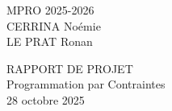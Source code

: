 \documentclass[class=article, crop=false]{standalone}
\begin{document}
\thispagestyle{plain}
\renewcommand{\footrulewidth}{0.4pt}
\renewcommand{\headrulewidth}{0.4pt}

\setlength{\parindent}{0pt}

\large
MPRO 2025-2026\\[0.25cm]
CERRINA Noémie\\[0.25cm]
LE PRAT Ronan

\vfill


\begin{center}
    \LARGE
    RAPPORT DE PROJET\\[0.7cm]
    \LARGE
    Programmation par Contraintes\\[0.7cm]
    \normalsize
    28 octobre 2025
\end{center}

\vfill
\end{document}
